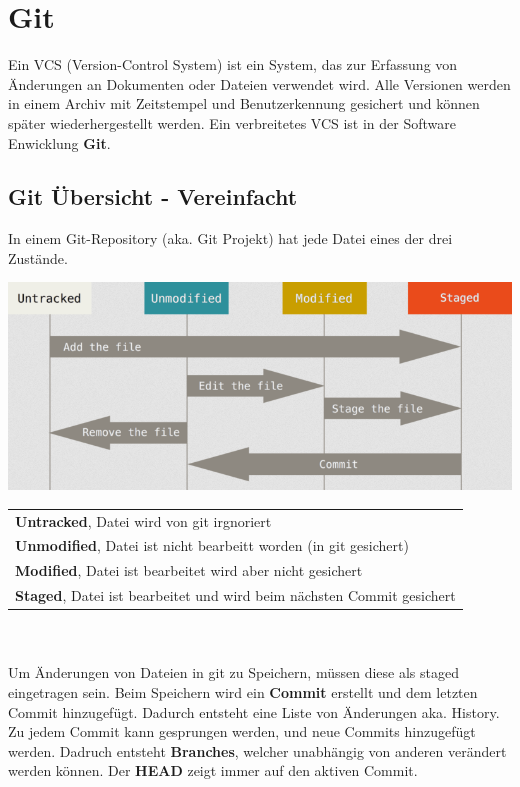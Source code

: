 \section{Git}
Ein VCS (Version-Control System) ist ein System, das zur Erfassung von Änderungen an Dokumenten oder Dateien verwendet wird. Alle Versionen werden in einem Archiv mit Zeitstempel und Benutzerkennung gesichert und können später wiederhergestellt werden. Ein verbreitetes VCS ist in der Software Enwicklung \textbf{Git}.

\subsection{Git Übersicht - Vereinfacht}
In einem Git-Repository (aka. Git Projekt) hat jede Datei eines der drei Zustände.\\
\begin{center}
	\includegraphics[width=\columnwidth]{Images/git.png}
\end{center}
\begin{tabular}{p{9cm}}
	\textbf{Untracked}, Datei wird von git irgnoriert \\
	\textbf{Unmodified}, Datei ist nicht bearbeitt worden (in git gesichert)\\
	\textbf{Modified}, Datei ist bearbeitet wird aber nicht gesichert\\
	\textbf{Staged}, Datei ist bearbeitet und wird beim nächsten Commit gesichert
\end{tabular}
~\\~\\
Um Änderungen von Dateien in git zu Speichern, müssen diese als staged eingetragen sein. Beim Speichern wird ein \textbf{Commit} erstellt und dem letzten Commit hinzugefügt. Dadurch entsteht eine Liste von Änderungen aka. History. Zu jedem Commit kann gesprungen werden, und neue Commits hinzugefügt werden. Dadruch entsteht \textbf{Branches}, welcher unabhängig von anderen verändert werden können. Der \textbf{HEAD} zeigt immer auf den aktiven Commit.
